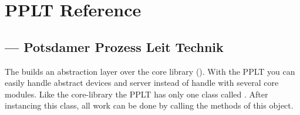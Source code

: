 \chapter{PPLT Reference}
\section{ ---
        \textbf{P}otsdamer \textbf{P}rozess \textbf{L}eit \textbf{T}echnik}


The  builds an abstraction layer over the core library 
(). With the PPLT you can easily handle abstract devices and 
server instead of handle with several core modules. Like the core-library the 
PPLT has only one class called . After instancing this class, all
work can be done by calling the methods of this object.

